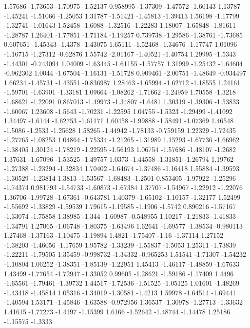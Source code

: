 \documentclass[9pt]{article}
\theoremstyle{plain}
\theoremstyle{definition}
\theoremstyle{remark}
\numberwithin{equation}{section}
\begin{document}
1.57686
-1.73653
-1.70975
-1.52137
0.958995
-1.37309
-1.47572
-1.60143
1.13787
-1.45241
-1.51066
-1.25053
1.31787
-1.51421
-1.45813
-1.39413
1.56198
-1.17799
-1.32741
-1.01643
1.52458
-1.6088
-1.32516
-1.22283
1.18007
-1.65848
-1.81611
-1.28787
1.26401
-1.77851
-1.71184
-1.19257
0.739738
-1.29586
-1.38761
-1.73685
0.607651
-1.45343
-1.4378
-1.43075
1.65111
-1.52468
-1.34676
-1.17747
1.01096
-1.16715
-1.27312
-0.62876
1.55742
-2.01167
-1.40521
-1.40754
1.29995
-1.5343
-1.44301
-0.743094
1.04009
-1.63445
-1.61155
-1.57757
1.31999
-1.25432
-1.64604
-0.962302
1.0044
-1.67504
-1.16131
-1.51728
0.909461
-2.00751
-1.48649
-0.934497
1.66234
-1.45731
-1.43551
-0.836987
1.28463
-1.65994
-1.62712
-1.18555
1.24161
-1.59701
-1.63901
-1.33181
1.09664
-1.08262
-1.71662
-1.24959
1.70558
-1.3218
-1.68621
-1.22091
0.867013
-1.49973
-1.34807
-1.6481
1.30319
-1.39306
-1.53833
-1.60067
1.23608
-1.5643
-1.70231
-1.22595
1.04755
-1.5323
-1.29499
-1.41092
1.34497
-1.6144
-1.62753
-1.61171
1.60458
-1.99888
-1.58491
-1.07369
1.46548
-1.5086
-1.2533
-1.25628
1.58265
-1.44942
-1.78133
-0.759159
1.22329
-1.72435
-1.27765
-1.08253
1.04864
-1.75334
-1.21265
-1.31989
1.15293
-1.67736
-1.66962
-1.38405
1.30124
-1.78219
-1.22595
-1.56193
1.06754
-1.57686
-1.48107
-1.2682
1.37631
-1.67096
-1.53525
-1.49757
1.0373
-1.44558
-1.31851
-1.26794
1.19762
-1.27388
-1.23294
-1.32834
1.70402
-1.64674
-1.37486
-1.16418
1.55884
-1.39593
-1.30529
-1.23814
1.3813
-1.53567
-1.68483
-1.2501
0.853405
-1.97922
-1.25296
-1.74374
0.981793
-1.54733
-1.60873
-1.67384
1.37707
-1.54967
-1.22912
-1.22076
1.36706
-1.99728
-1.67361
-0.643781
1.40379
-1.65102
-1.10157
-1.32177
1.52499
-1.55692
-1.33829
-1.59539
1.79615
-1.19585
-1.1906
-1.5742
0.890216
-1.57167
-1.33074
-1.75858
1.38985
-1.344
-1.60987
-0.548955
1.10217
-1.21833
-1.41833
-1.34791
1.27065
-1.06748
-1.80375
-1.63496
1.62641
-1.69577
-1.38534
-0.980113
1.27468
-1.37163
-1.10475
-1.19894
1.4821
-1.75407
-1.16
-1.37114
1.27152
-1.38203
-1.46056
-1.17659
1.95782
-1.33239
-1.55837
-1.5053
1.25311
-1.73839
-1.22211
-1.79505
1.35459
-0.998732
-1.34332
-0.965253
1.51541
-1.71307
-1.54232
-1.10804
1.06252
-1.38351
-1.85139
-1.22951
1.45413
-1.46117
-1.48859
-1.67633
1.43499
-1.77654
-1.72947
-1.33052
0.99605
-1.28621
-1.59186
-1.17409
1.4496
-1.65561
-1.79461
-1.39732
1.44517
-1.72536
-1.51525
-1.05125
1.01601
-1.48269
-1.43418
-1.45814
1.05316
-1.34019
-1.30581
-1.4213
1.59978
-1.64514
-1.69441
-1.40594
1.53171
-1.45846
-1.63588
-0.972956
1.36537
-1.30978
-1.27713
-1.33632
1.41615
-1.77273
-1.4197
-1.15399
1.6166
-1.52642
-1.48744
-1.14478
1.25186
-1.15575
-1.3333
\end{document}
